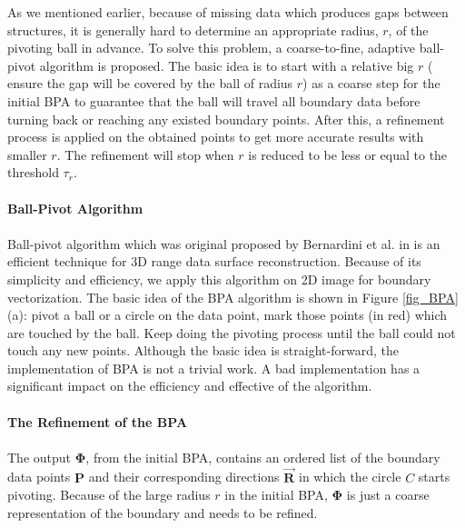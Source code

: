 \documentclass[12pt,letterpaper]{article}
\begin{document}
As we mentioned earlier, because of missing data which produces gaps between structures, it
is generally hard to determine an appropriate radius, $r$, of the pivoting ball in advance.
To solve this problem, a coarse-to-fine, adaptive ball-pivot algorithm is proposed.
The basic idea is to start with a relative big $r$ ( ensure the gap will be covered by the ball of radius $r$) as
a coarse step for the initial BPA to guarantee that the ball will travel all boundary data before
turning back or reaching any existed boundary points. After this, a refinement process
is applied on the obtained points to get more accurate results with smaller $r$.
The refinement will stop when $r$ is reduced to be less or equal to the threshold $\tau_r$.
\\
\\
\textbf{Ball-Pivot Algorithm}
\label{sec_BPA}
\\
\\
Ball-pivot algorithm which was original proposed by Bernardini et al. in \cite{BPA_BMRS} is an
efficient technique for 3D range data surface reconstruction. Because of its simplicity and efficiency,
we apply this algorithm on 2D image for boundary vectorization. The basic idea of the BPA algorithm is
shown in Figure \ref{fig_BPA}(a): pivot a ball or a circle on the data point, mark those points (in red)
which are touched by the ball. Keep doing the pivoting process until the ball could not touch any new points.
Although the basic idea is straight-forward, the implementation of BPA is not a trivial work.
A bad implementation has a significant impact on the efficiency and effective of the algorithm.
\\
\\
\textbf{The Refinement of the BPA}
\\
\\
The output $\boldsymbol{\Phi}$, from the initial BPA, contains an ordered list of the boundary data
points $\boldsymbol{P}$ and their corresponding directions $\overrightarrow{\boldsymbol{R}}$ in which
the circle $C$ starts pivoting.
Because of the large radius $r$ in the initial BPA, $\boldsymbol{\Phi}$ is just a coarse representation
of the boundary and needs to be refined.
\end{document}
